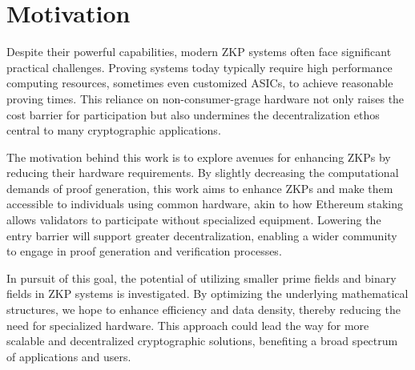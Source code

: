 \chapter{Motivation}

Despite their powerful capabilities, modern ZKP systems often face significant
practical challenges. Proving systems today typically require high performance
computing resources, sometimes even customized ASICs, to achieve reasonable
proving times. This reliance on non-consumer-grage hardware not only raises
the cost barrier for participation but also undermines the decentralization
ethos central to many cryptographic applications.

The motivation behind this work is to explore avenues for enhancing ZKPs by
reducing their hardware requirements. By slightly decreasing the computational
demands of proof generation, this work aims to enhance ZKPs and make them accessible to
individuals using common hardware, akin to how Ethereum staking allows
validators to participate without specialized equipment. Lowering the entry
barrier will support greater decentralization, enabling a wider community to
engage in proof generation and verification processes.

In pursuit of this goal, the potential of utilizing smaller prime fields and
binary fields in ZKP systems is investigated. By optimizing the underlying
mathematical structures, we hope to enhance efficiency and data density,
thereby reducing the need for specialized hardware. This approach could lead
the way for more scalable and decentralized cryptographic solutions,
benefiting a broad spectrum of applications and users.
